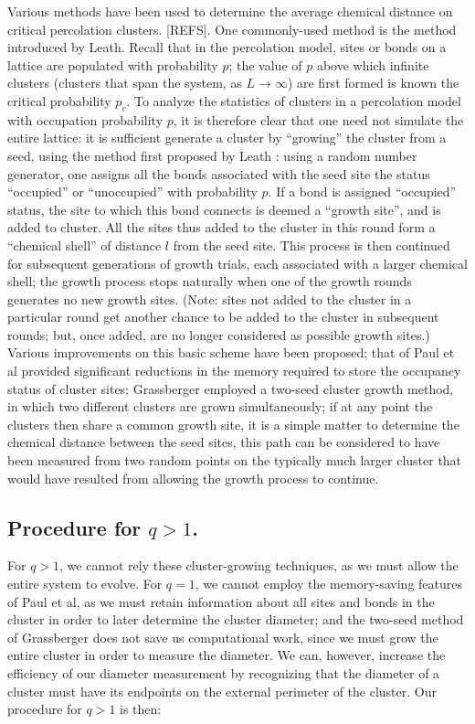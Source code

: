\documentclass[pre,preprint,11pt]{revtex4}
\begin{document}
Various methods have been used to determine the average chemical distance on critical percolation clusters. [REFS].  One commonly-used method is the method introduced by Leath.  Recall that in the percolation model, sites or bonds on a lattice are populated with probability $p$; the value of $p$ above which infinite clusters (clusters that span the system, as $L \to \infty$) are first formed is known the critical probability $p_c$.  To analyze the statistics of clusters in a percolation model with occupation probability $p$, it is therefore clear that one need not simulate the entire lattice:  it is sufficient generate a cluster by ``growing'' the cluster from a seed, using the method first proposed by Leath \cite{Leath}: using a random number generator, one assigns all the bonds associated with the seed site the status ``occupied'' or ``unoccupied'' with probability $p$.  If a bond is assigned ``occupied'' status, the site to which this bond connects is deemed a ``growth site'', and is added to cluster.  All the sites thus added to the cluster in this round form a ``chemical shell'' of distance $l$ from the seed site.  This process is then continued for subsequent generations of growth trials, each associated with a larger chemical shell; the growth process stops naturally when one of the growth rounds generates no new growth sites.  (Note: sites not added to the cluster in a particular round get another chance to be added to the cluster in subsequent rounds; but, once added, are no longer considered as possible growth sites.) Various improvements on this basic scheme have been proposed; that of Paul et al \cite{Paul2001} provided significant reductions in the memory required to store the occupancy status of cluster sites; Grassberger\cite{Gr99} employed a two-seed cluster growth method, in which two different clusters are grown simultaneously; if at any point the clusters then share a common growth site, it is a simple matter to determine the chemical distance between the seed sites, this path can be considered to have been measured from two random points on the typically much larger cluster that would have resulted from allowing the growth process to continue.  


\subsection{ Procedure for $q>1$.} 

For $q>1$, we cannot rely these cluster-growing techniques, as we must allow the entire system to evolve. For $q=1$, we cannot  employ the memory-saving features of Paul et al, as we must retain information about all sites and bonds in the cluster in order to later determine the cluster diameter; and the two-seed method of Grassberger does not save us computational work, since we must grow the entire cluster in order to measure the diameter.  We can, however, increase the efficiency of our diameter measurement by recognizing that the diameter of a cluster must have its endpoints on the external perimeter of the cluster.  Our procedure for $q>1$ is then:
\end{document}
